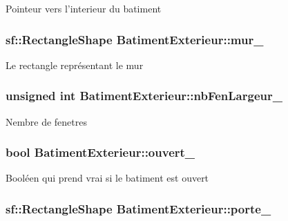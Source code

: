 Pointeur vers l'interieur du batiment \hypertarget{classBatimentExterieur_a6929037a2c2ab1893c4992452454e7f6}{
\subsubsection[{mur\-\_\-}]{\setlength{\rightskip}{0pt plus 5cm}sf\-::\-Rectangle\-Shape Batiment\-Exterieur\-::mur\-\_\-\hspace{0.3cm}{\ttfamily [private]}}}\label{classBatimentExterieur_a6929037a2c2ab1893c4992452454e7f6}
Le rectangle représentant le mur \hypertarget{classBatimentExterieur_a67bacf13a8f3a238d89d8685a750ff40}{
\subsubsection[{nb\-Fen\-Largeur\-\_\-}]{\setlength{\rightskip}{0pt plus 5cm}unsigned int Batiment\-Exterieur\-::nb\-Fen\-Largeur\-\_\-\hspace{0.3cm}{\ttfamily [private]}}}\label{classBatimentExterieur_a67bacf13a8f3a238d89d8685a750ff40}
Nembre de fenetres \hypertarget{classBatimentExterieur_a10dcc22bae2b39269bbcb0318430305c}{
\subsubsection[{ouvert\-\_\-}]{\setlength{\rightskip}{0pt plus 5cm}bool Batiment\-Exterieur\-::ouvert\-\_\-\hspace{0.3cm}{\ttfamily [private]}}}\label{classBatimentExterieur_a10dcc22bae2b39269bbcb0318430305c}
Booléen qui prend vrai si le batiment est ouvert \hypertarget{classBatimentExterieur_a175feefa144902956539361a17be4b4b}{
\subsubsection[{porte\-\_\-}]{\setlength{\rightskip}{0pt plus 5cm}sf\-::\-Rectangle\-Shape Batiment\-Exterieur\-::porte\-\_\-\hspace{0.3cm}{\ttfamily [private]}}}\label{classBatimentExterieur_a175feefa144902956539361a17be4b4b}
